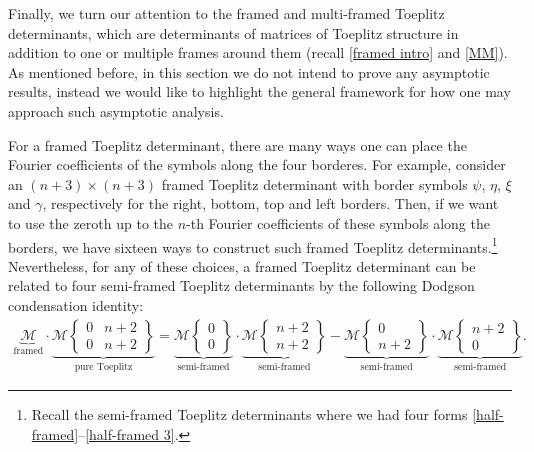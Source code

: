 \documentclass[pdftex]{sigma}
\numberwithin{equation}{section}
\newcommand{\ga}{\gamma}
\begin{document}
		
		Finally, we turn our attention to the framed and multi-framed Toeplitz determinants, which are determinants of matrices of Toeplitz structure in addition to one or multiple frames around them (recall \eqref{framed intro} and \eqref{MM}). As mentioned before, in this section we do not intend to prove any asymptotic results, instead we would like to highlight the general framework for how one may approach such asymptotic analysis.
		
		For a framed Toeplitz determinant, there are many ways one can place the Fourier coefficients of the symbols along the four borderes. For example, consider an $(n+3) \times (n+3)$ framed Toeplitz determinant with border symbols $\psi$, $\eta$, $\xi$ and $\ga$, respectively for the right, bottom, top and left borders. Then, if we want to use the zeroth up to the $n$-th Fourier coefficients of these symbols along the borders, we have sixteen ways to construct such framed Toeplitz determinants.\footnote{Recall the semi-framed Toeplitz determinants where we had four forms \eqref{half-framed}--\eqref{half-framed 3}.} Nevertheless, for any of these choices, a framed Toeplitz determinant can be related to four semi-framed Toeplitz determinants by the following Dodgson condensation identity:
		\begin{gather}\label{DODGSON framed B}
\underbrace{\mathscr{M}}_{\text{framed}}
			\cdot \underbrace{ \mathscr{M}\left\lbrace \begin{matrix} 0 & n+2 \\ 0 & n+2 \end{matrix} \right\rbrace }_{\text{pure Toeplitz}} = \underbrace{ \mathscr{M}\left\lbrace \begin{matrix} 0 \\ 0 \end{matrix} \right\rbrace }_{\text{semi-framed}} \cdot \underbrace{ \mathscr{M}\left\lbrace \begin{matrix} n+2 \\ n+2 \end{matrix} \right\rbrace}_{\text{semi-framed}} - \underbrace{ \mathscr{M}\left\lbrace \begin{matrix} 0 \\ n+2 \end{matrix} \right\rbrace}_{\text{semi-framed}} \cdot \underbrace{ \mathscr{M}\left\lbrace \begin{matrix} n+2 \\ 0 \end{matrix} \right\rbrace}_{\text{semi-framed}}.
		\end{gather}
		
\end{document}
